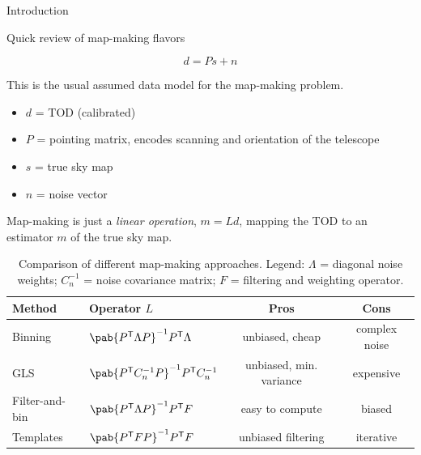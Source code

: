 \documentclass[final]{beamer}
\newcommand{\transpose}[1]{\ensuremath{#1^{\mathsf T}}}
\newlength{\colwidth}
\begin{document}
\begin{frame}[t]
\begin{columns}[t]
\begin{column}{\colwidth}
\begin{block}{Introduction}
      \end{block}

      \begin{block}{Quick review of map-making flavors}


        \begin{equation}\label{eq:data_model}
          d = P s + n
        \end{equation}

        This is the usual assumed data model for the map-making problem.

        \begin{itemize}
          \item $d$ = TOD (calibrated)
          \item $P$ = pointing matrix, encodes scanning and orientation of the telescope
          \item $s$ = true sky map
          \item $n$ = noise vector
        \end{itemize}

        Map-making is just a \emph{linear operation}, $m = Ld$, mapping the TOD to an estimator $m$ of the true sky map.

        \begin{table}
          \centering
          \begin{tabular}{l l c c}
            \toprule
            \textbf{Method} & \textbf{Operator} $L$                                            & \textbf{Pros}           & \textbf{Cons} \\
            \midrule
            Binning         & \( \pab{\transpose{P} \Lambda P}^{-1} \transpose{P} \Lambda \)   & unbiased, cheap         & complex noise \\
            \midrule
            GLS             & \( \pab{\transpose{P} C_n^{-1} P}^{-1} \transpose{P} C_n^{-1} \) & unbiased, min. variance & expensive     \\
            \midrule
            Filter-and-bin  & \( \pab{\transpose{P} {\Lambda P}}^{-1} \transpose{P} F \)       & easy to compute         & biased        \\
            \midrule
            Templates       & \( \pab{\transpose{P} F P}^{-1} \transpose{P} F \)               & unbiased filtering      & iterative     \\
            \bottomrule
          \end{tabular}
          \caption{Comparison of different map-making approaches. Legend: $\Lambda$ = diagonal noise weights; $C_n^{-1}$ = noise covariance matrix; $F$ = filtering and weighting operator.}
        \end{table}


\end{block}
\end{column}
\end{columns}
\end{frame}
\end{document}
